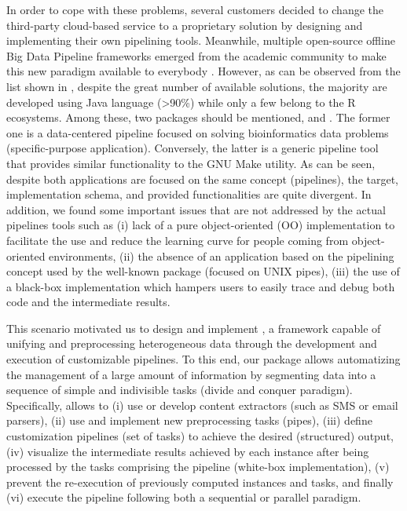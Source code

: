 In order to cope with these problems, several customers decided to change the third-party cloud-based service to a proprietary solution by designing and implementing their own pipelining tools. Meanwhile, multiple open-source offline Big Data Pipeline frameworks emerged from the academic community to make this new paradigm available to everybody \citep{D14}. However, as can be observed from the list shown in \citep{D14}, despite the great number of available solutions, the majority are developed using Java language (>90\%) while only a few belong to the R ecosystems. Among these, two packages should be mentioned,  \citep{repo} and  \citep{drake}. The former one is a data-centered pipeline focused on solving bioinformatics data problems (specific-purpose application). Conversely, the latter is a generic pipeline tool that provides similar functionality to the GNU Make utility. As can be seen, despite both applications are focused on the same concept (pipelines), the target, implementation schema, and provided functionalities are quite divergent. In addition, we found some important issues that are not addressed by the actual pipelines tools such as (i) lack of a pure object-oriented (OO) implementation to facilitate the use and reduce the learning curve for people coming from object-oriented environments, (ii) the absence of an application based on the pipelining concept used by the well-known  package \citep{magrittr} (focused on UNIX pipes), (iii) the use of a black-box implementation which hampers users to easily trace and debug both code and the intermediate results.

This scenario motivated us to design and implement , a framework capable of unifying and preprocessing heterogeneous data through the development and execution of customizable pipelines. To this end, our package allows automatizing the management of a large amount of information by segmenting data into a sequence of simple and indivisible tasks (divide and conquer paradigm). Specifically,  allows to (i) use or develop content extractors (such as SMS or email parsers), (ii) use and implement new preprocessing tasks (pipes), (iii) define customization pipelines (set of tasks) to achieve the desired (structured) output, (iv) visualize the intermediate results achieved by each instance after being processed by the tasks comprising the pipeline (white-box implementation), (v) prevent the re-execution of previously computed instances and tasks, and finally (vi) execute the pipeline following both a sequential or parallel paradigm.

